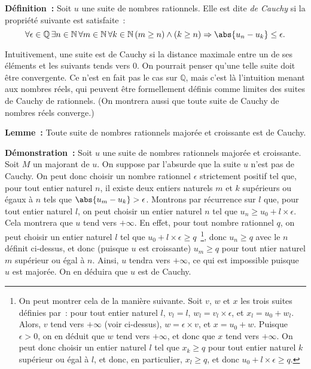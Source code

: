 \noindent\textbf{Définition :} Soit $u$ une suite de nombres rationnels. 
    Elle est dite \textit{de Cauchy} si la propriété suivante est satisfaite : 
    \begin{equation*}
        \forall \epsilon \in \mathbb{Q} \, 
        \exists n \in \mathbb{N} \,
        \forall m \in \mathbb{N} \,
        \forall k \in \mathbb{N} \,
        (m \geq n) \wedge (k \geq n)
        \Rightarrow \abs{u_n - u_k} \leq \epsilon
        .
    \end{equation*}

\medskip

Intuitivement, une suite est de Cauchy si la distance maximale entre un de ses éléments et les suivants tends vers $0$. 
On pourrait penser qu'une telle suite doit être convergente. 
Ce n'est en fait pas le cas sur $\mathbb{Q}$, mais c'est là l'intuition menant aux nombres réels, qui peuvent être formellement définis comme limites des suites de Cauchy de rationnels. 
(On montrera aussi que toute suite de Cauchy de nombres réels converge.)

\medskip

\noindent\textbf{Lemme :} Toute suite de nombres rationnels majorée et croissante est de Cauchy. 

\medskip

\noindent\textbf{Démonstration :} Soit $u$ une suite de nombres rationnels majorée et croissante. 
    Soit $M$ un majorant de $u$.
    On suppose par l'absurde que la suite $u$ n'est pas de Cauchy. 
    On peut donc choisir un nombre rationnel $\epsilon$ strictement positif tel que, pour tout entier naturel $n$, il existe deux entiers naturels $m$ et $k$ supérieurs ou égaux à $n$ tels que $\abs{u_m - u_k} > \epsilon$. 
    Montrons par récurrence sur $l$ que, pour tout entier naturel $l$, on peut choisir un entier naturel $n$ tel que $u_n \geq u_0 + l \times \epsilon$. 
    Cela montrera que $u$ tend vers $+\infty$. 
    En effet, pour tout nombre rationnel $q$, on peut choisir un entier naturel $l$ tel que $u_0 + l \times \epsilon \geq q$~\footnote{
        On peut montrer cela de la manière suivante. 
        Soit $v$, $w$ et $x$ les trois suites définies par : pour tout entier naturel $l$, $v_l = l$, $w_l = v_l \times \epsilon$, et $x_l = u_0 + w_l$.
        Alors, $v$ tend vers $+\infty$ (voir ci-dessus), $w = \epsilon \times v$, et $x = u_0 + w$.
        Puisque $\epsilon > 0$, on en déduit que $w$ tend vers $+\infty$, et donc que $x$ tend vers $+\infty$. 
        On peut donc choisir un entier naturel $l$ tel que $x_k \geq q$ pour tout entier naturel $k$ supérieur ou égal à $l$, et donc, en particulier, $x_l \geq q$, et donc $u_0 + l \times \epsilon \geq q$.
    }, donc $u_n \geq q$ avec le $n$ définit ci-dessus, et donc (puisque $u$ est croissante) $u_m \geq q$ pour tout ntier naturel $m$ supérieur ou égal à $n$.
    Ainsi, $u$ tendra vers $+\infty$, ce qui est impossible puisque $u$ est majorée.
    On en déduira que $u$ est de Cauchy.

